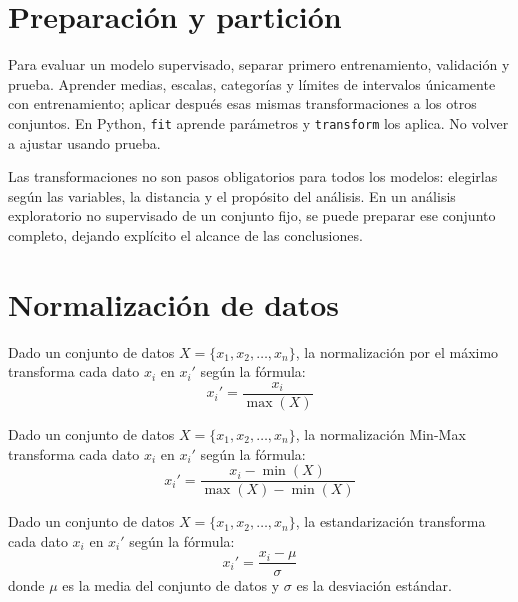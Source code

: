 \documentclass[a4,11pt]{aleph-notas}
\begin{document}
\encabezado


\section{Preparación y partición}
Para evaluar un modelo supervisado, separar primero entrenamiento, validación y prueba. Aprender medias, escalas, categorías y límites de intervalos únicamente con entrenamiento; aplicar después esas mismas transformaciones a los otros conjuntos. En Python, \texttt{fit} aprende parámetros y \texttt{transform} los aplica. No volver a ajustar usando prueba.

Las transformaciones no son pasos obligatorios para todos los modelos: elegirlas según las variables, la distancia y el propósito del análisis. En un análisis exploratorio no supervisado de un conjunto fijo, se puede preparar ese conjunto completo, dejando explícito el alcance de las conclusiones.

\section{Normalización de datos}

\begin{defi}
    Dado un conjunto de datos \(X = \{x_1, x_2, \ldots, x_n\}\), la normalización por el máximo transforma cada dato \(x_i\) en \(x_i'\) según la fórmula:
    \[
    x_i' = \frac{x_i}{\max(X)}
    \]
\end{defi}

\begin{defi}
    Dado un conjunto de datos \(X = \{x_1, x_2, \ldots, x_n\}\), la normalización Min-Max transforma cada dato \(x_i\) en \(x_i'\) según la fórmula:
    \[
    x_i' = \frac{x_i - \min(X)}{\max(X) - \min(X)}
    \]
\end{defi}

\begin{defi}
    Dado un conjunto de datos \(X = \{x_1, x_2, \ldots, x_n\}\), la estandarización transforma cada dato \(x_i\) en \(x_i'\) según la fórmula:
    \[
    x_i' = \frac{x_i - \mu}{\sigma}
    \]
    donde \(\mu\) es la media del conjunto de datos y \(\sigma\) es la desviación estándar.
\end{defi}
\end{document}
